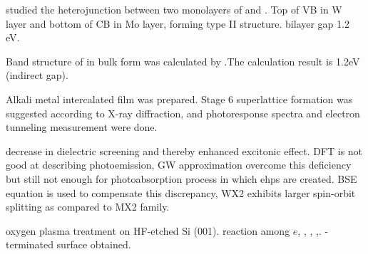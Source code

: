 \citeauthor{Kosmider2013} studied the heterojunction between two monolayers of  and . Top of VB in W layer and bottom of CB in Mo layer, forming type II structure. bilayer gap 1.2 eV.\cite{Kosmider2013}

Band structure  of  in bulk form was calculated by \citeauthor{Mattheiss1973}.The calculation result is 1.2eV (indirect gap).\cite{Mattheiss1973}

Alkali metal intercalated  film was prepared.\cite{Homyonfer1997} Stage 6 superlattice formation was suggested according to X-ray diffraction, and photoresponse spectra and electron tunneling measurement were done.

decrease in dielectric screening and thereby enhanced excitonic effect.
DFT is not good at describing photoemission, GW approximation overcome this deficiency but still not enough for photoabsorption process in which ehps are created. BSE equation is used to compensate this discrepancy, WX2 exhibits larger spin-orbit splitting as compared to MX2 family.\cite{Ramasubramaniam2012}

oxygen plasma treatment on HF-etched Si (001). reaction among $e$, , , ,. -terminated surface obtained.\cite{Habib2010}